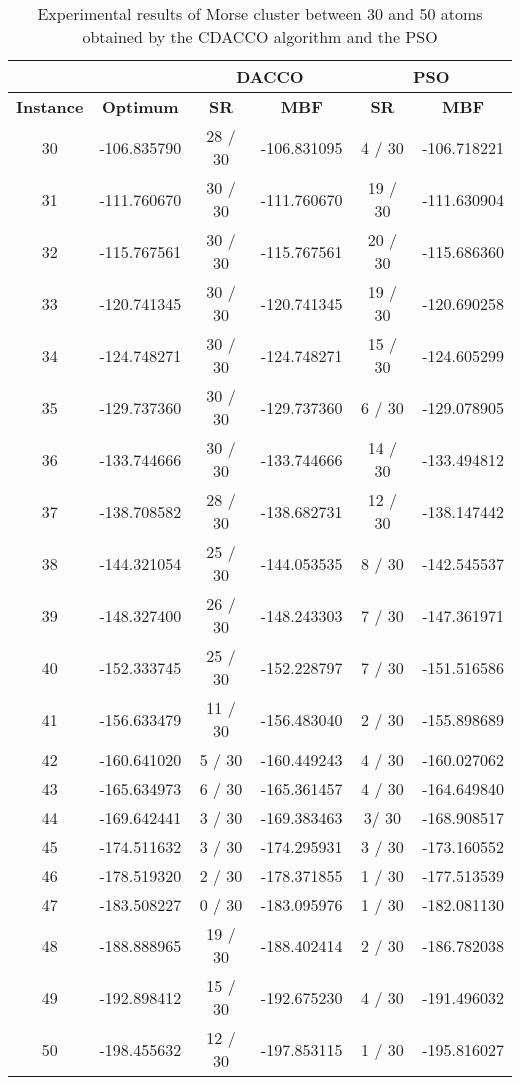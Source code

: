	\begin{table}[!htdp]
			\label{tab:dacco_vs_pso}
			\begin{center}
				\begin{tabular}{| c | c | c | c | c | c |}
					\hline
					\multicolumn{2}{|c|}{} & \multicolumn{2}{c|}{\textbf{DACCO}} & \multicolumn{2}{c|}{\textbf{PSO}}\\ \hline
					\textbf{Instance} & \textbf{Optimum} & \textbf{SR} & \textbf{MBF} & \textbf{SR} & \textbf{MBF} \\ \hline
					30 & -106.835790 & 28 / 30 & -106.831095 & 4 / 30 & -106.718221 \\ \hline
					31 & -111.760670 & 30 / 30 & -111.760670 & 19 / 30 & -111.630904 \\ \hline
					32 & -115.767561 & 30 / 30 & -115.767561 & 20 / 30 & -115.686360 \\ \hline
					33 & -120.741345 & 30 / 30 & -120.741345 & 19 / 30 & -120.690258 \\ \hline
					34 & -124.748271 & 30 / 30 & -124.748271 & 15 / 30 & -124.605299 \\ \hline
					35 & -129.737360 & 30 / 30 & -129.737360 & 6 / 30 & -129.078905 \\ \hline
					36 & -133.744666 & 30 / 30 & -133.744666 & 14 / 30 & -133.494812 \\ \hline
					37 & -138.708582 & 28 / 30 & -138.682731 & 12 / 30 & -138.147442 \\ \hline
					38 & -144.321054 & 25 / 30 & -144.053535 & 8 / 30 & -142.545537 \\ \hline
					39 & -148.327400 & 26 / 30 & -148.243303 & 7 / 30 & -147.361971 \\ \hline
					40 & -152.333745 & 25 / 30 & -152.228797 & 7 / 30 & -151.516586 \\ \hline
					41 & -156.633479 & 11 / 30 & -156.483040 & 2 / 30 & -155.898689 \\ \hline
					42 & -160.641020 & 5 / 30 & -160.449243 & 4 / 30 & -160.027062 \\ \hline
					43 & -165.634973 & 6 / 30 & -165.361457 & 4 / 30 & -164.649840 \\ \hline
					44 & -169.642441 & 3 / 30 & -169.383463 & 3/ 30 & -168.908517 \\ \hline
					45 & -174.511632 & 3 / 30 & -174.295931 & 3 / 30 & -173.160552 \\ \hline
					46 & -178.519320 & 2 / 30 & -178.371855 & 1 / 30 & -177.513539 \\ \hline
					47 & -183.508227 & 0 / 30 & -183.095976 & 1 / 30 & -182.081130 \\ \hline
					48 & -188.888965 & 19 / 30 & -188.402414 & 2 / 30 & -186.782038 \\ \hline
					49 & -192.898412 & 15 / 30 & -192.675230 & 4 / 30 & -191.496032 \\ \hline
					50 & -198.455632 & 12 / 30 & -197.853115 & 1 / 30 & -195.816027 \\ \hline
				\end{tabular}
			\end{center}
			\caption{Experimental results of Morse cluster between 30 and 50 atoms obtained by the CDACCO algorithm and the PSO}
		\end{table}
		
